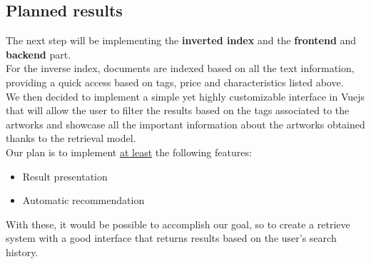 \documentclass[12pt]{spieman}  %
\begin{document}
\begin{spacing}{1}
    \vspace*{-0.5cm}\section{Planned results}
    The next step will be implementing the \textbf{inverted index} and the \textbf{frontend} and \textbf{backend} part.\\
    For the inverse index, documents are indexed based on all the text information, providing a quick access based on
    tags, price and characteristics listed above.\\
    We then decided to implement a simple yet highly customizable interface in Vuejs that will allow the user to filter the results
    based on the tags associated to the artworks and showcase all the important information about the artworks obtained thanks to the retrieval model. \\
    Our plan is to implement \underline{at least} the following features:
    \begin{itemize}
        \setlength\itemsep{0.3em}
        \item Result presentation
        \item Automatic recommendation
    \end{itemize}
    With these, it would be possible to accomplish our goal, so to create a retrieve system with a good interface
    that returns results based on the user's search history.
\end{spacing}
\end{document}
